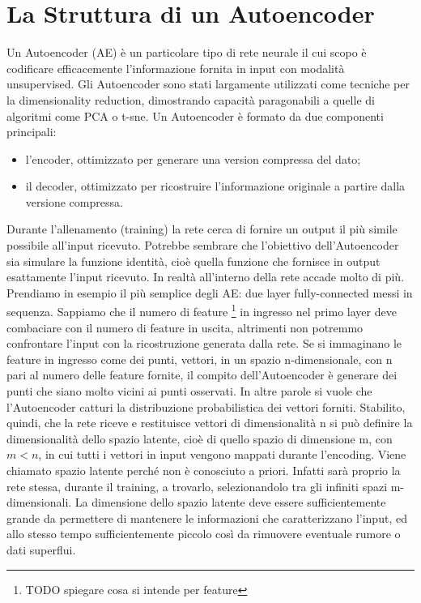 \section{La Struttura di un Autoencoder}
Un Autoencoder (AE) è un particolare tipo di rete neurale il cui scopo è codificare efficacemente l'informazione fornita in input con modalità unsupervised.
Gli Autoencoder sono stati largamente utilizzati come tecniche per la dimensionality reduction, dimostrando capacità paragonabili a quelle di algoritmi come PCA o t-sne.
Un Autoencoder è formato da due componenti principali:
\begin{itemize}
    \item l'encoder, ottimizzato per generare una version compressa del dato;
    \item il decoder, ottimizzato per ricostruire l'informazione originale a partire dalla versione compressa.
\end{itemize}
Durante l'allenamento (training) la rete cerca di fornire un output il più simile possibile all'input ricevuto.
Potrebbe sembrare che l'obiettivo %
dell'Autoencoder sia simulare la funzione identità, cioè quella funzione che fornisce in output esattamente l'input ricevuto.
In realtà all'interno della rete accade molto di più.
Prendiamo in esempio il più semplice degli AE: due layer fully-connected messi in sequenza.
Sappiamo che il numero di feature \footnote{TODO spiegare cosa si intende per feature} in ingresso nel primo layer deve combaciare con il numero di feature in uscita, altrimenti non potremmo confrontare l'input con la ricostruzione generata dalla rete.
Se si immaginano le feature in ingresso come dei punti, vettori, in un spazio n-dimensionale, con n pari al numero delle feature fornite, il compito dell'Autoencoder è generare dei punti che siano molto vicini ai punti osservati.
In altre parole si vuole che l'Autoencoder catturi la distribuzione probabilistica dei vettori forniti.
Stabilito, quindi, che la rete riceve e restituisce vettori di dimensionalità n si può definire la dimensionalità dello spazio latente, cioè di quello spazio di dimensione m, con $m < n$, in cui tutti i  vettori in input vengono mappati durante l'encoding.
Viene chiamato spazio latente perché non è conosciuto a priori.
Infatti sarà proprio la rete stessa, durante il training, a trovarlo, selezionandolo tra gli infiniti spazi m-dimensionali.
La dimensione dello spazio latente deve essere sufficientemente grande da permettere di mantenere le informazioni che caratterizzano l'input, ed allo stesso tempo sufficientemente piccolo così da rimuovere eventuale rumore o dati superflui.
